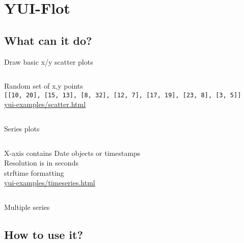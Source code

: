 \documentclass{beamer}
\begin{document}
\section{YUI-Flot}
\subsection{What can it do?}

\begin{frame}{Draw basic x/y scatter plots}
  \begin{columns}[c]
    \begin{block}{}
      \small{Random set of x,y points} \\
      \texttt{\tiny{[[10, 20], [15, 13], [8, 32], [12, 7], [17, 19], [23, 8], [3, 5]]}} \\
      \href{http://bluesmoon.github.com/yui-flot/yui-examples/scatter.html}{\small{yui-examples/scatter.html}} \\
    \end{block}
  \end{columns}
\end{frame}

\begin{frame}{Series plots}
  \begin{columns}[c]
    \begin{block}{}
      \small{X-axis contains Date objects or timestamps} \\
      \small{Resolution is in seconds} \\
      \small{strftime formatting} \\
      \href{http://bluesmoon.github.com/yui-flot/yui-examples/timeseries.html}{\small{yui-examples/timeseries.html}} \\
    \end{block}
  \end{columns}
\end{frame}

\begin{frame}{Multiple series}
\end{frame}

\subsection{How to use it?}
\end{document}
